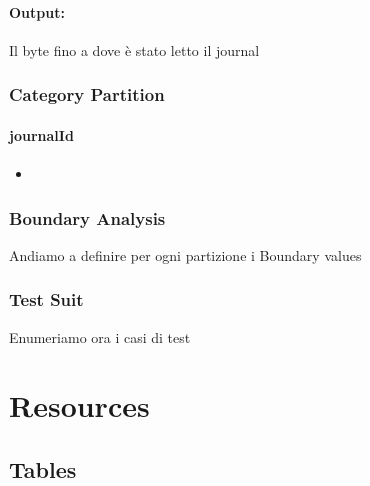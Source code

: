 \documentclass[12pt, a4paper]{article}
\begin{document}
\paragraph{Output:}
Il byte fino a dove è stato letto il journal

\subsubsection{Category Partition}

\paragraph{journalId}
\begin{itemize}
  \item 
\end{itemize}



\subsubsection{Boundary Analysis}
Andiamo a definire per ogni partizione i Boundary values

\subsubsection{Test Suit}
Enumeriamo ora i casi di test



\section{Resources}
\subsection{Tables}
\end{document}
